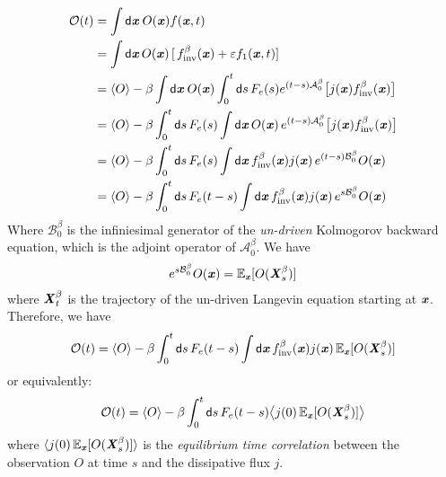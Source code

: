 \documentclass[aip,jcp,a4paper,reprint,onecolumn]{revtex4-1}
\newcommand{\vect}[1]{\textbf{\textit{#1}}}
\newcommand{\dd}{\textsf{d}}
\newcommand{\inv}{\textrm{inv}}
\newcommand{\ml}{\mathcal L}
\newcommand{\fwg}{{\mathcal A}}
\newcommand{\bwg}{{\mathcal B}}
\begin{document}
\begin{align}\nonumber
  \mathcal O(t)
  &=
  \int\dd \vect x \:O(\vect x)f(\vect x, t)  \\\nonumber
  &=
  \int\dd \vect x\, O(\vect x)\,
  [\,f_{\inv}^\beta(\vect x) + \varepsilon f_1(\vect x, t)] \\\nonumber
  &=
  \langle O\rangle
  -
  \beta
  \int \dd \vect x\:
  O(\vect x)
  \int_0^t\dd s\,F_e(s)
  e^{(t-s)\fwg_0^\beta}
  \big[j(\vect x)f^\beta_{\inv}(\vect x)\big]
  \\\nonumber
  &=
  \langle O\rangle
  -
  \beta
  \int_0^t\dd s\,
  F_e(s)
  \int \dd \vect x\,
  O(\vect x)\,
  e^{(t-s)\fwg_0^\beta}
  \big[j(\vect x)f^\beta_{\inv}(\vect x)\big]
  \\\nonumber
  &=
  \langle O\rangle
  -
  \beta
  \int_0^t\dd s\,
  F_e(s)
  \int \dd \vect x\,
  f^\beta_{\inv}(\vect x) j(\vect x)\,
  e^{(t-s)\bwg^\beta_0}
  O(\vect x)\\ \label{eqn:eqi-pert-1}
  &=
  \langle O\rangle
  -
  \beta
  \int_0^t\dd s\,
  F_e(t-s)
  \int \dd \vect x\,
  f^\beta_{\inv}(\vect x) j(\vect x)\,
  e^{s\bwg_0^\beta}
  O(\vect x)
\end{align}
Where $\bwg^\beta_0$ is the infiniesimal generator of the \emph{un-driven} 
Kolmogorov backward equation, which is the adjoint operator of $\fwg^\beta_0$.
We have
\begin{align}
  e^{s\bwg^\beta_0} O(\vect x) = \mathbb E_{\vect x} [O(\vect X^\beta_s)]
\end{align}
where $\vect X^\beta_t$ is the trajectory of the un-driven Langevin equation
starting at $\vect x$.
Therefore, we have
\begin{align}
  \mathcal O(t)
  =
  \langle O\rangle
  -
  \beta
  \int_0^t\dd s\,
  F_e(t-s)
  \int \dd \vect x\,
  f^\beta_{\inv}(\vect x)
  j(\vect x)\,
  \mathbb E_{\vect x} [O(\vect X^\beta_s)]
\end{align}
or equivalently:
\begin{align}\label{eqn:lr}
  \mathcal O(t)
  =
  \langle O\rangle
  -
  \beta
  \int_0^t\dd s\,
  F_e(t-s)
  \big\langle
  j(0)\,
  \mathbb E_{\vect x} [O(\vect X^\beta_s)]
  \big\rangle
\end{align}
where $  \langle
  j(0)\,
  \mathbb E_{\vect x} [O(\vect X^\beta_s)]
  \rangle$ is the \emph{equilibrium time
  correlation} between the observation $O$ at time $s$ and the
dissipative flux $j$.
\end{document}

